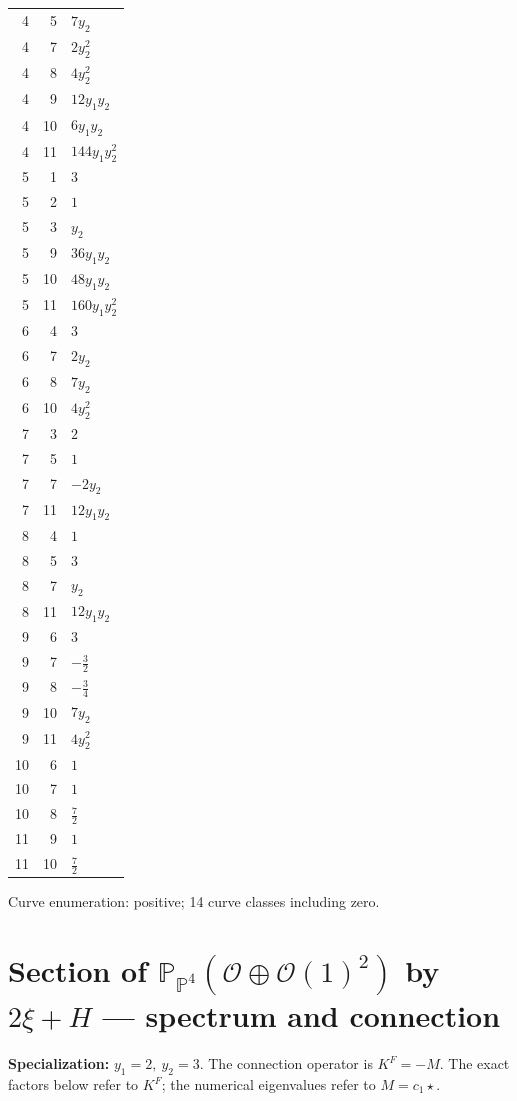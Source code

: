 \documentclass[10pt,a4paper]{article}
\begin{document}
{\begin{longtable}{rrp{125mm}}
4 & 5 & $7 y_{2}$\\
4 & 7 & $2 y_{2}^{2}$\\
4 & 8 & $4 y_{2}^{2}$\\
4 & 9 & $12 y_{1} y_{2}$\\
4 & 10 & $6 y_{1} y_{2}$\\
4 & 11 & $144 y_{1} y_{2}^{2}$\\
5 & 1 & $3$\\
5 & 2 & $1$\\
5 & 3 & $y_{2}$\\
5 & 9 & $36 y_{1} y_{2}$\\
5 & 10 & $48 y_{1} y_{2}$\\
5 & 11 & $160 y_{1} y_{2}^{2}$\\
6 & 4 & $3$\\
6 & 7 & $2 y_{2}$\\
6 & 8 & $7 y_{2}$\\
6 & 10 & $4 y_{2}^{2}$\\
7 & 3 & $2$\\
7 & 5 & $1$\\
7 & 7 & $- 2 y_{2}$\\
7 & 11 & $12 y_{1} y_{2}$\\
8 & 4 & $1$\\
8 & 5 & $3$\\
8 & 7 & $y_{2}$\\
8 & 11 & $12 y_{1} y_{2}$\\
9 & 6 & $3$\\
9 & 7 & $- \frac{3}{2}$\\
9 & 8 & $- \frac{3}{4}$\\
9 & 10 & $7 y_{2}$\\
9 & 11 & $4 y_{2}^{2}$\\
10 & 6 & $1$\\
10 & 7 & $1$\\
10 & 8 & $\frac{7}{2}$\\
11 & 9 & $1$\\
11 & 10 & $\frac{7}{2}$\\
\end{longtable}}
Curve enumeration: positive; 14 curve classes including zero.
\clearpage\section*{Section of $\mathbb P_{\mathbb P^{4}}(\mathcal O\oplus \mathcal O(1)^{2})$ by $2\xi +H$ --- spectrum and connection}
\textbf{Specialization:} $y_1=2,\ y_2=3$. The connection operator is $K^F=-M$. The exact factors below refer to $K^F$; the numerical eigenvalues refer to $M=c_1\star$.
\end{document}
